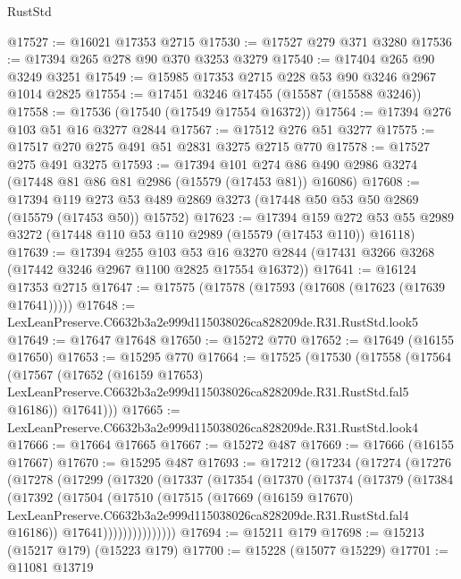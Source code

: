 \begin{lexlean}{RustStd}
\begin{coremodule}
@17527 := @16021 @17353 @2715
@17530 := @17527 @279 @371 @3280
@17536 := @17394 @265 @278 @90 @370 @3253 @3279
@17540 := @17404 @265 @90 @3249 @3251
@17549 := @15985 @17353 @2715 @228 @53 @90 @3246 @2967 @1014 @2825
@17554 := @17451 @3246 @17455 (@15587 (@15588 @3246))
@17558 := @17536 (@17540 (@17549 @17554 @16372))
@17564 := @17394 @276 @103 @51 @16 @3277 @2844
@17567 := @17512 @276 @51 @3277
@17575 := @17517 @270 @275 @491 @51 @2831 @3275 @2715 @770
@17578 := @17527 @275 @491 @3275
@17593 := @17394
    @101
    @274
    @86
    @490
    @2986
    @3274
    (@17448 @81 @86 @81 @2986 (@15579 (@17453 @81)) @16086)
@17608 := @17394
    @119
    @273
    @53
    @489
    @2869
    @3273
    (@17448 @50 @53 @50 @2869 (@15579 (@17453 @50)) @15752)
@17623 := @17394
    @159
    @272
    @53
    @55
    @2989
    @3272
    (@17448 @110 @53 @110 @2989 (@15579 (@17453 @110)) @16118)
@17639 := @17394
    @255
    @103
    @53
    @16
    @3270
    @2844
    (@17431 @3266 @3268 (@17442 @3246 @2967 @1100 @2825 @17554 @16372))
@17641 := @16124 @17353 @2715
@17647 := @17575 (@17578 (@17593 (@17608 (@17623 (@17639 @17641)))))
@17648 := LexLeanPreserve.C6632b3a2e999d115038026ca828209de.R31.RustStd.look5
@17649 := @17647 @17648
@17650 := @15272 @770
@17652 := @17649 (@16155 @17650)
@17653 := @15295 @770
@17664 := @17525
    (@17530
      (@17558
        (@17564
          (@17567
            (@17652
              (@16159 @17653)
              LexLeanPreserve.C6632b3a2e999d115038026ca828209de.R31.RustStd.fal5
              @16186))
          @17641)))
@17665 := LexLeanPreserve.C6632b3a2e999d115038026ca828209de.R31.RustStd.look4
@17666 := @17664 @17665
@17667 := @15272 @487
@17669 := @17666 (@16155 @17667)
@17670 := @15295 @487
@17693 := @17212
    (@17234
      (@17274
        (@17276
          (@17278
            (@17299
              (@17320
                (@17337
                  (@17354
                    (@17370
                      (@17374
                        (@17379
                          (@17384
                            (@17392
                              (@17504
                                (@17510
                                  (@17515
                                    (@17669
                                      (@16159 @17670)
                                      LexLeanPreserve.C6632b3a2e999d115038026ca828209de.R31.RustStd.fal4
                                      @16186))
                                  @17641)))))))))))))))
@17694 := @15211 @179
@17698 := @15213 (@15217 @179) (@15223 @179)
@17700 := @15228 (@15077 @15229)
@17701 := @11081 @13719

\end{coremodule}
\end{lexlean}
